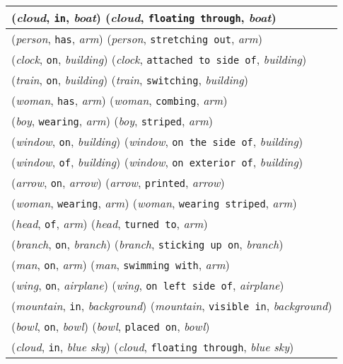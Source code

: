 \documentclass[runningheads]{llncs}
\begin{document}
{\begin{longtable}{ l }
(\textit{cloud}, \texttt{in}, \textit{boat})  (\textit{cloud}, \texttt{floating through}, \textit{boat}) \\ \hline
(\textit{person}, \texttt{has}, \textit{arm})  (\textit{person}, \texttt{stretching out}, \textit{arm}) \\ \hline
(\textit{clock}, \texttt{on}, \textit{building})  (\textit{clock}, \texttt{attached to side of}, \textit{building}) \\ \hline
(\textit{train}, \texttt{on}, \textit{building})  (\textit{train}, \texttt{switching}, \textit{building}) \\ \hline
(\textit{woman}, \texttt{has}, \textit{arm})  (\textit{woman}, \texttt{combing}, \textit{arm}) \\ \hline
(\textit{boy}, \texttt{wearing}, \textit{arm})  (\textit{boy}, \texttt{striped}, \textit{arm}) \\ \hline
(\textit{window}, \texttt{on}, \textit{building})  (\textit{window}, \texttt{on the side of}, \textit{building}) \\ \hline
(\textit{window}, \texttt{of}, \textit{building})  (\textit{window}, \texttt{on exterior of}, \textit{building}) \\ \hline
(\textit{arrow}, \texttt{on}, \textit{arrow})  (\textit{arrow}, \texttt{printed}, \textit{arrow}) \\ \hline
(\textit{woman}, \texttt{wearing}, \textit{arm})  (\textit{woman}, \texttt{wearing striped}, \textit{arm}) \\ \hline
(\textit{head}, \texttt{of}, \textit{arm})  (\textit{head}, \texttt{turned to}, \textit{arm}) \\ \hline
(\textit{branch}, \texttt{on}, \textit{branch})  (\textit{branch}, \texttt{sticking up on}, \textit{branch}) \\ \hline
(\textit{man}, \texttt{on}, \textit{arm})  (\textit{man}, \texttt{swimming with}, \textit{arm}) \\ \hline
(\textit{wing}, \texttt{on}, \textit{airplane})  (\textit{wing}, \texttt{on left side of}, \textit{airplane}) \\ \hline
(\textit{mountain}, \texttt{in}, \textit{background})  (\textit{mountain}, \texttt{visible in}, \textit{background}) \\ \hline
(\textit{bowl}, \texttt{on}, \textit{bowl})  (\textit{bowl}, \texttt{placed on}, \textit{bowl}) \\ \hline
(\textit{cloud}, \texttt{in}, \textit{blue sky})  (\textit{cloud}, \texttt{floating through}, \textit{blue sky}) \\ \hline

\end{longtable}}
\end{document}
